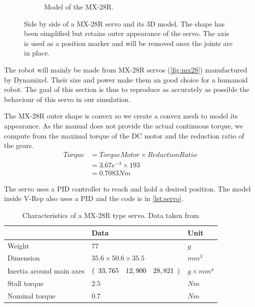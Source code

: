 \begin{figure}[htp]
\begin{subfigure}[b]{0.3\textwidth}
    \caption{Model of the MX-28R.}
    \label{fig:mx28_model}
\end{subfigure}
\caption{Side by side of a MX-28R servo and its 3D model. The shape has been simplified but retains outer appearance of the servo. The axis is used as a position marker and will be removed once the joints are in place.}
\label{fig:servo}
\end{figure}

The robot will mainly be made from MX-28R servos (\cref{fig:mx28}) manufactured by Dynamixel. Their size and power make them an good choice for a humanoid robot. The goal of this section is thus to reproduce as accurately as possible the behaviour of this servo in our simulation. 

The MX-28R outer shape is convex so we create a convex mesh to model its appearance. As the manual \cite{mx_28_manual} does not provide the actual continuous torque, we compute from the maximal torque of the DC motor and the reduction ratio of the gears. 
\begin{align*}
Torque &= TorqueMotor \times ReductionRatio\\
&= 3.67e^{-3} \times 193\\
&= 0.7083Nm
\end{align*}

\begin{table}[htp]

The servo uses a PID controller to reach and hold a desired position. The model inside V-Rep also uses a PID and the code is in \cref{lst:servo}.
\center
\begin{tabularx}{\textwidth}{@{} l l X @{}}
\toprule
& \textbf{Data} & \textbf{Unit}\\ 
\midrule
Weight & $77$ & $g$\\
Dimension & $35.6 \times 50.6 \times 35.5$ & $mm^3$\\
Inertia around main axes & $(\begin{array}{c c c}
33,765 & 12,900 & 28,821
\end{array})$ & $g \times mm^4$ \\
Stall torque & $2.5$ & $Nm$\\
Nominal torque & $0.7$ & $Nm$\\
\bottomrule
\end{tabularx}
\caption{Characteristics of a MX-28R type servo. Data taken from \cite{mx_28_manual}}
\label{table:specs}
\end{table} 

